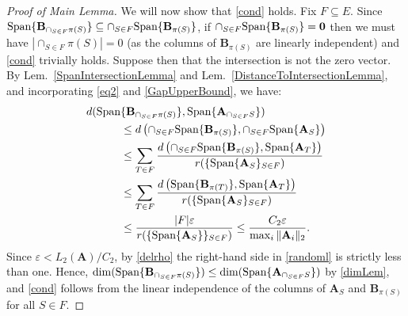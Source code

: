 \documentclass[9pt,twocolumn]{pnas-new}
\begin{document}
\begin{proof}[Proof of Main Lemma]
We will now show that \eqref{cond} holds.
Fix $F \subseteq E$. Since $\text{\rm Span}\{\mathbf{B}_{\cap_{S \in F}\pi(S)}\} \subseteq \cap_{S \in F} \text{\rm Span}\{\mathbf{B}_{\pi(S)}\}$, if $\cap_{S \in F} \text{\rm Span}\{\mathbf{B}_{\pi(S)}\} = \textbf{0}$ then we must have $|\cap_{S \in F} \pi(S)| = 0$ (as the columns of $\mathbf{B}_{\pi(S)}$ are linearly independent) and \eqref{cond} trivially holds. Suppose then that the intersection is not the zero vector. By Lem.~\ref{SpanIntersectionLemma} and Lem.~\ref{DistanceToIntersectionLemma}, and incorporating \eqref{eq2} and \eqref{GapUpperBound}, we have:
\begin{align}\label{randoml}
d( \text{\rm Span}&\{\mathbf{B}_{\cap_{S \in F}\pi(S)}\}, \text{\rm Span}\{\mathbf{A}_{\cap_{S \in F} S}\}  ) \nonumber \\
&\leq d\left( \cap_{S \in F} \text{\rm Span}\{\mathbf{B}_{\pi(S)}\}, \cap_{S \in F} \text{\rm Span}\{\mathbf{A}_{S}\} \right) \nonumber \\
&\leq \sum_{T \in F} \frac{ d\left( \cap_{S \in F} \text{\rm Span}\{\mathbf{B}_{\pi(S)}\},\text{\rm Span}\{\mathbf{A}_{T}\} \right) }{ r( \{ \text{\rm Span}\{\mathbf{A}_{S}\}_{S \in F}) } \nonumber \\
&\leq \sum_{T \in F} \frac{ d\left( \text{\rm Span}\{\mathbf{B}_{\pi(T)}\},\text{\rm Span}\{\mathbf{A}_{T}\} \right) }{ r( \{ \text{\rm Span}\{\mathbf{A}_{S}\}_{S \in F}) }\nonumber \\
&\leq \frac{|F| \varepsilon}{r( \{ \text{\rm Span}\{\mathbf{A}_{S}\} \}_{S \in F})} 
\leq \frac{C_2 \varepsilon}{\max_i\|\mathbf{A}_i\|_2}. 
\end{align}
Since $\varepsilon < L_2(\mathbf{A}) / C_2$, by \eqref{delrho} the right-hand side in \eqref{randoml} is strictly less than one. Hence, $\dim(\text{\rm Span}\{\mathbf{B}_{\cap_{S \in F}\pi(S)}\}) \leq \dim(\text{\rm Span}\{\mathbf{A}_{\cap_{S \in F} S}\})$ by \eqref{dimLem}, and \eqref{cond} follows from the linear independence of the columns of $\mathbf{A}_{S}$ and $\mathbf{B}_{\pi(S)}$ for all $S \in F$.


\end{proof}
\end{document}
